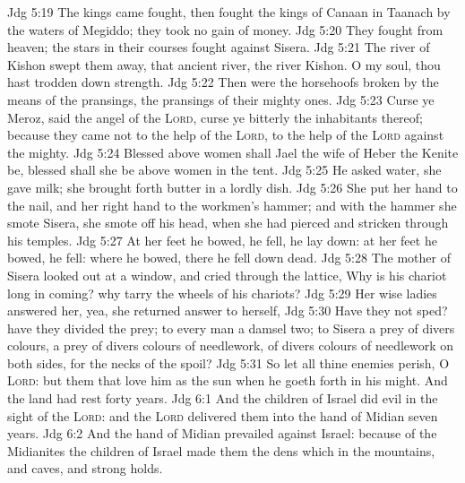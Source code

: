 \vs Jdg 5:19 The kings came  fought, then fought the kings of Canaan in Taanach by the waters of Megiddo; they took no gain of money.
\vs Jdg 5:20 They fought from heaven; the stars in their courses fought against Sisera.
\vs Jdg 5:21 The river of Kishon swept them away, that ancient river, the river Kishon. O my soul, thou hast trodden down strength.
\vs Jdg 5:22 Then were the horsehoofs broken by the means of the pransings, the pransings of their mighty ones.
\vs Jdg 5:23 Curse ye Meroz, said the angel of the \textsc{Lord}, curse ye bitterly the inhabitants thereof; because they came not to the help of the \textsc{Lord}, to the help of the \textsc{Lord} against the mighty.
\vs Jdg 5:24 Blessed above women shall Jael the wife of Heber the Kenite be, blessed shall she be above women in the tent.
\vs Jdg 5:25 He asked water,  she gave  milk; she brought forth butter in a lordly dish.
\vs Jdg 5:26 She put her hand to the nail, and her right hand to the workmen's hammer; and with the hammer she smote Sisera, she smote off his head, when she had pierced and stricken through his temples.
\vs Jdg 5:27 At her feet he bowed, he fell, he lay down: at her feet he bowed, he fell: where he bowed, there he fell down dead.
\vs Jdg 5:28 The mother of Sisera looked out at a window, and cried through the lattice, Why is his chariot  long in coming? why tarry the wheels of his chariots?
\vs Jdg 5:29 Her wise ladies answered her, yea, she returned answer to herself,
\vs Jdg 5:30 Have they not sped? have they  divided the prey; to every man a damsel  two; to Sisera a prey of divers colours, a prey of divers colours of needlework, of divers colours of needlework on both sides,  for the necks of  the spoil?
\vs Jdg 5:31 So let all thine enemies perish, O \textsc{Lord}: but  them that love him  as the sun when he goeth forth in his might. And the land had rest forty years.
\vs Jdg 6:1 And the children of Israel did evil in the sight of the \textsc{Lord}: and the \textsc{Lord} delivered them into the hand of Midian seven years.
\vs Jdg 6:2 And the hand of Midian prevailed against Israel:  because of the Midianites the children of Israel made them the dens which  in the mountains, and caves, and strong holds.
